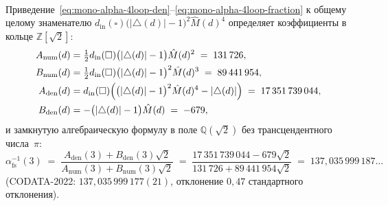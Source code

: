 \begin{theorem}
\begin{enumerate}[label=\textbf{(\arabic*)},leftmargin=*]
\begin{align}
  \end{align}
  Приведение~\eqref{eq:mono-alpha-4loop-den}--\eqref{eq:mono-alpha-4loop-fraction} к общему целому знаменателю $d_{\mathrm{in}}(\square)\bigl(|{\triangle}(d)|-1\bigr)^2\widehat{M}(d)^4$ определяет коэффициенты в кольце $\mathbb{Z}[\sqrt{2}]$:
  \begin{align}
    A_{\mathrm{num}}(d) &= \tfrac{1}{2}d_{\mathrm{in}}(\square)\bigl(|{\triangle}(d)|-1\bigr)\hat{M}(d)^2 \;=\; 131\,726, \label{eq:mono-alpha-zsqrt2-coeffs} \\
    B_{\mathrm{num}}(d) &= \tfrac{1}{2}d_{\mathrm{in}}(\square)\bigl(|{\triangle}(d)|-1\bigr)^2\hat{M}(d)^3 \;=\; 89\,441\,954, \label{eq:mono-alpha-bnum} \\
    A_{\mathrm{den}}(d) &= d_{\mathrm{in}}(\square)\Bigl(\bigl(|{\triangle}(d)|-1\bigr)^2\hat{M}(d)^4 - |{\triangle}(d)|\Bigr) \;=\; 17\,351\,739\,044, \label{eq:mono-alpha-aden} \\
    B_{\mathrm{den}}(d) &= -\bigl(|{\triangle}(d)|-1\bigr)\hat{M}(d) \;=\; -679, \label{eq:mono-alpha-bden}
  \end{align}
  и замкнутую алгебраическую формулу в поле $\mathbb{Q}(\sqrt{2})$ без трансцендентного числа~$\pi$:
  \begin{equation}
    \label{eq:mono-alpha-codata}
    \alpha_{\mathrm{fs}}^{-1}(3) \;=\; \frac{A_{\mathrm{den}}(3) + B_{\mathrm{den}}(3)\sqrt{2}}{A_{\mathrm{num}}(3) + B_{\mathrm{num}}(3)\sqrt{2}} \;=\; \frac{17\,351\,739\,044 - 679\sqrt{2}}{131\,726 + 89\,441\,954\sqrt{2}} \;=\; 137{,}035\,999\,187\dots
  \end{equation}
  (CODATA-2022: $137{,}035\,999\,177(21)$, отклонение $0{,}47$ стандартного отклонения).
\end{enumerate}
\end{theorem}

